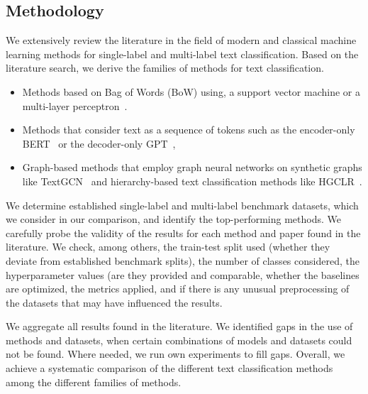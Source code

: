 \documentclass[acmsmall,nonacm]{acmart}
\begin{document}
\subsection{Methodology}

We extensively review the literature in the field of modern and classical machine learning methods for single-label and multi-label text classification.
Based on the literature search, we derive the families of methods for text classification. 

\begin{itemize}
\item Methods based on Bag of Words (BoW) using, \eg a support vector machine or a multi-layer perceptron~\cite{galkescherp-acl2022}.

\item Methods that consider text as a sequence of tokens such as the encoder-only BERT~\cite{DBLP:conf/naacl/DevlinCLT19} or the decoder-only GPT~\cite{DBLP:conf/nips/BrownMRSKDNSSAA20}, 

\item Graph-based methods that employ graph neural networks on synthetic graphs like TextGCN~\cite{DBLP:conf/aaai/YaoM019} and hierarchy-based text classification methods like HGCLR~\cite{DBLP:conf/acl/WangWH0W22}.
\end{itemize}

We determine established single-label and multi-label benchmark datasets, which we consider in our comparison, and identify the top-performing methods.
We carefully probe the validity of the results for each method and paper found in the literature.
We check, among others, the train-test split used (whether they deviate from established benchmark splits), 
the number of classes considered, 
the hyperparameter values (are they provided and comparable, 
whether the baselines are optimized, 
the metrics applied, 
and if there is any unusual preprocessing of the datasets that may have influenced the results.  

We aggregate all results found in the literature.
We identified gaps in the use of methods and datasets, \ie when certain combinations of models and datasets could not be found.
Where needed, we run own experiments to fill gaps.
Overall, we achieve a systematic comparison of the different text classification methods among the different families of methods.
\end{document}
